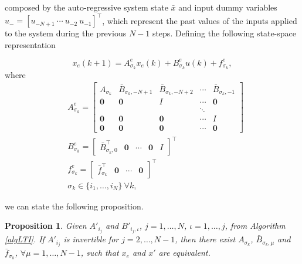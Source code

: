 \documentclass[letterpaper, 10 pt, conference]{ifacconf}  %
\newtheorem{proposition}[theorem]{Proposition}
\begin{document}
composed by the auto-regressive system state $\bar x$ and input dummy variables $u_- = [u_{-N+1}\ \cdots\ u_{-2}\ u_{-1}]^\top$, which represent the past values of the inputs applied to the system during the previous $N-1$ steps.
Defining the following state-space representation

\small
\begin{equation}\label{eqExtendedSwitchedSystem} 
	x_e(k+1) = A_{\sigma_k}^e x_e(k) + B_{\sigma_k}^e u(k) + f^e_{\sigma_k},	
\end{equation}
\normalsize
where
\small
\begin{align}
&A_{\sigma_k}^e = \left[\begin{array}{ccccc}
							A_{\sigma_k}    & \bar B_{\sigma_k,-N+1} & \bar B_{\sigma_k,-N+2} & \cdots & \bar B_{\sigma_k,-1} \\
							\mathbf{0} & \mathbf{0}      & I            	 & \cdots & \mathbf{0}   \\
									&                 &              	 & \ddots &            \\
							\mathbf{0} & \mathbf{0}      & \mathbf{0}   	 & \cdots & I          \\
							\mathbf{0} & \mathbf{0}      & \mathbf{0}   	 & \cdots & \mathbf{0}   
						\end{array}
				  \right]\label{eqAeij} \\
&B_{\sigma_k}^e = \left[\begin{array}{ccccc}
							\bar B_{\sigma_k,0}^\top  &	\mathbf{0} & \cdots & \mathbf{0} & I  
						\end{array}
				  \right]^\top\label{eqBeij}\\
&f_{\sigma_k}^e = \left[\begin{array}{cccc}
							\bar f_{\sigma_k}^\top  &	\mathbf{0} & \cdots & \mathbf{0}  
						\end{array}
				  \right]^\top\label{eqfeij}\\
&\sigma_k      \in\{i_1,\ldots,i_N\}\ \forall k,
\end{align}
\normalsize

we can state the following proposition.

\begin{proposition}\label{propSwitchedSystem}
	Given $A'_{i_j}$ and $B'_{i_j,\iota}$, $j=1,\ldots,N$, $\iota=1,\ldots,j$, from Algorithm \ref{algLTI}. If $A'_{i_j}$ is invertible for $j=2,\ldots,N-1$, then there exist $A_{\sigma_k}$, $\bar B_{\sigma_k,\mu}$ and $\bar f_{\sigma_k}$, $\forall \mu=1,\ldots,N-1$, such that $x_e$ and $x'$ are equivalent.
\end{proposition}
\end{document}
